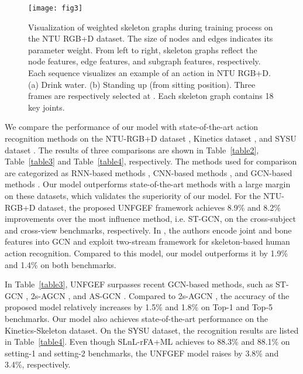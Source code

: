 \documentclass[journal]{IEEEtran}
\begin{document}
\begin{figure*}
\centering
\texttt{[image: fig3]}
\caption{Visualization of weighted skeleton graphs during training process on the NTU RGB+D dataset. The size of nodes and edges indicates its parameter weight. From left to right, skeleton graphs reflect the node features, edge features, and subgraph features, respectively. Each sequence visualizes an example of an action in NTU RGB+D. (a) Drink water. (b) Standing up (from sitting position). Three frames are respectively selected at . Each skeleton graph contains 18 key joints.}
\label{fig5}
\end{figure*}
We compare the performance of our model with state-of-the-art action recognition methods on the
NTU-RGB+D dataset \cite{Shahroudy_2016_NTURGBD,liu2017two,liu2016spatio,song2017end,zhang2017view,li2018skeleton,li2018independently,kim2017interpretable,ke2017new,liu2017enhanced,yan2018spatial,du2015skeleton,li2017skeleton,tang2018deep,shi2019two} , Kinetics dataset \cite{fernando2015modeling,Shahroudy_2016_NTURGBD,kim2017interpretable,yan2018spatial,Li_2019_CVPR,shi2019two}
, and SYSU dataset \cite{zhang2019view,zhang2018adding,zhang2020semantics,hu2019joint}. The results of three comparisons are shown in Table~\ref{table2}, Table~\ref{table3} and Table~\ref{table4}, respectively. The methods used for comparison are categorized as RNN-based methods \cite{Shahroudy_2016_NTURGBD, liu2016spatio,song2017end,zhang2017view,li2018skeleton,fernando2015modeling,zhang2019view,zhang2018adding}, CNN-based methods \cite{liu2017two,li2018independently,kim2017interpretable,ke2017new,liu2017enhanced,du2015skeleton,li2017skeleton,tang2018deep}, and GCN-based methods \cite{yan2018spatial,shi2019two,Li_2019_CVPR,zhang2020semantics,hu2019joint}. Our model outperforms state-of-the-art methods with a large margin on these datasets, which validates the superiority of our model. For the NTU-RGB+D dataset, the proposed UNFGEF framework achieves 8.9\% and 8.2\% improvements over the most influence method, i.e. ST-GCN, on the cross-subject and cross-view benchmarks, respectively. In \cite{shi2019two}, the authors encode joint and bone features into GCN and exploit two-stream framework for skeleton-based human action recognition. Compared to this model, our model outperforms it by 1.9\% and 1.4\% on both benchmarks.

In Table~\ref{table3}, UNFGEF surpasses recent GCN-based methods, such as ST-GCN \cite{yan2018spatial}, 2s-AGCN \cite{shi2019two}, and AS-GCN \cite{Li_2019_CVPR}. Compared to 2s-AGCN \cite{shi2019two}, the accuracy of the proposed model relatively increases by 1.5\% and 1.8\% on Top-1 and Top-5 benchmarks. Our model also achieves state-of-the-art performance on the Kinetics-Skeleton dataset. On the SYSU dataset, the recognition results are listed in Table~\ref{table4}. Even though SLnL-rFA+ML \cite{hu2019joint} achieves to 88.3\% and 88.1\% on setting-1 and setting-2 benchmarks, the UNFGEF model raises by 3.8\% and 3.4\%, respectively.
\end{document}

